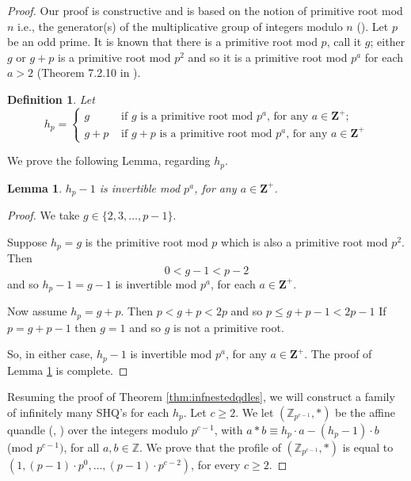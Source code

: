 \documentclass{article}
\newtheorem{lemma}[theorem]{Lemma}
\newtheorem{definition}[theorem]{Definition}
\begin{document}
\begin{proof}
Our proof is constructive and is based on the notion of primitive root mod $n$ i.e., the generator(s) of the multiplicative group of integers modulo $n$ (\cite{Kumanduri_Romero}). Let $p$ be an odd prime. It is known that  there is a primitive root mod $p$, call it $g$; either $g$ or $g+p$ is a primitive root mod $p^2$ and so it is a primitive root mod $p^a$ for each $a>2$ (Theorem 7.2.10 in \cite{Kumanduri_Romero}).
\begin{definition}
Let
\[
h_p=\begin{cases}
g & \text{ if $g$ is a primitive root mod $p^a$, for any $a\in \mathbf{Z}^+$};\\
g+p & \text{ if $g+p$ is a primitive root mod $p^a$, for any $a\in \mathbf{Z}^+$}
\end{cases}
\]
\end{definition} We prove the following Lemma, regarding  $h_p$.

\begin{lemma}\label{lem:g-1}
$h_p-1$ is invertible mod $p^a$, for any $a\in \mathbf{Z}^+$.
\end{lemma}
\begin{proof}
We take $g\in \{  2, 3, \dots , p-1 \}$.


Suppose $h_p=g$ is the primitive root mod $p$ which is also a primitive root mod $p^2$. Then $$0<g-1<p-2$$ and so $h_p-1=g-1$ is invertible mod $p^a$, for each $a\in \mathbf{Z}^+$.

Now assume $h_p=g+p$. Then $p<g+p<2p$ and so $p\leq g+p-1 < 2p-1$ If $p=g+p-1$ then $g=1$  and so $g$ is not a primitive root.

So, in either case, $h_p-1$ is invertible mod $p^a$, for any $a\in \mathbf{Z}^+$. The proof of Lemma \ref{lem:g-1} is complete.
\end{proof}


Resuming the proof of Theorem \ref{thm:infnestedqdles}, we will construct a family of infinitely many SHQ's for each $h_p$. Let $c\geq2$. We let $(\mathbb{Z}_{p^{c-1}},*)$ be the affine quandle (\cite{Kajiwara_Nakayama}, \cite{Lages_Lopes}) over the integers modulo $p^{c-1}$, with $a*b\equiv h_p\cdot a-(h_p-1)\cdot b$ (mod $p^{c-1})$, for all $a,b\in\mathbb{Z}$. We prove that the profile of $(\mathbb{Z}_{p^{c-1}},*)$ is equal to $(1,(p-1)\cdot p^0,\dots,(p-1)\cdot p^{c-2})$, for every $c\geq2$.\par


\end{proof}
\end{document}

